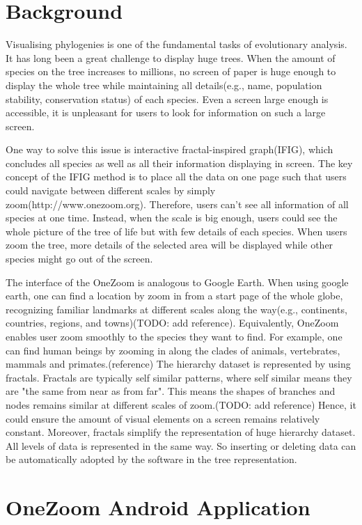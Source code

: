 \documentclass[MSc]{icldt}
\begin{document}
\section{Background}

Visualising phylogenies is one of the fundamental tasks of evolutionary analysis. It has long been a great challenge to display huge trees. When the amount of species on the tree increases to millions, no screen of paper is huge enough to display the whole tree while maintaining all details(e.g., name, population stability, conservation status) of each species. Even a screen large enough is accessible, it is unpleasant for users to look for information on such a large screen. 

One way to solve this issue is interactive fractal-inspired graph(IFIG), which concludes all species as well as all their information displaying in screen. The key concept of the IFIG method is to place all the data on one page such that users could navigate between different scales by simply zoom(http://www.onezoom.org). Therefore, users can't see all information of all species at one time. Instead, when the scale is big enough, users could see the whole picture of the tree of life but with few details of each species. When users zoom the tree, more details of the selected area will be displayed while other species might go out of the screen.

The interface of the OneZoom is analogous to Google Earth. When using google earth, one can find a location by zoom in from a start page of the whole globe, recognizing familiar landmarks at different scales along the way(e.g., continents, countries, regions, and towns)(TODO: add reference). Equivalently, OneZoom enables user zoom smoothly to the species they want to find. For example, one can find human beings by zooming in along the clades of animals, vertebrates, mammals and primates.(reference) The hierarchy dataset is represented by using fractals. Fractals are typically self similar patterns, where self similar means they are "the same from near as from far". This means the shapes of branches and nodes remains similar at different scales of zoom.(TODO: add reference) Hence, it could ensure the amount of visual elements on a screen remains relatively constant. Moreover, fractals simplify the representation of huge hierarchy dataset. All levels of data is represented in the same way. So inserting or deleting data can be automatically adopted by the software in the tree representation.

\section{OneZoom Android Application}
\end{document}
